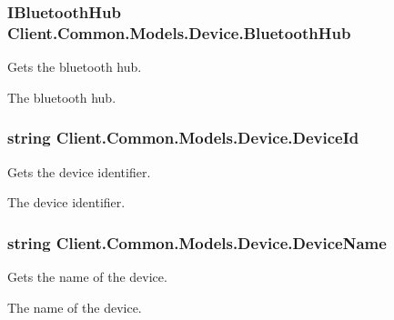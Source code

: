 \subsubsection[{Bluetooth\+Hub}]{\setlength{\rightskip}{0pt plus 5cm}I\+Bluetooth\+Hub Client.\+Common.\+Models.\+Device.\+Bluetooth\+Hub\hspace{0.3cm}{\ttfamily [get]}}\label{classClient_1_1Common_1_1Models_1_1Device_aa60310c6baea9e6d3953dc9b6cb469d9}


Gets the bluetooth hub. 

The bluetooth hub.\hypertarget{classClient_1_1Common_1_1Models_1_1Device_afcedfb23804f4fa905e3cf534d17d44e}{}
\subsubsection[{Device\+Id}]{\setlength{\rightskip}{0pt plus 5cm}string Client.\+Common.\+Models.\+Device.\+Device\+Id\hspace{0.3cm}{\ttfamily [get]}}\label{classClient_1_1Common_1_1Models_1_1Device_afcedfb23804f4fa905e3cf534d17d44e}


Gets the device identifier. 

The device identifier.\hypertarget{classClient_1_1Common_1_1Models_1_1Device_a256551335f6465871fa46566a4f6cb13}{}
\subsubsection[{Device\+Name}]{\setlength{\rightskip}{0pt plus 5cm}string Client.\+Common.\+Models.\+Device.\+Device\+Name\hspace{0.3cm}{\ttfamily [get]}}\label{classClient_1_1Common_1_1Models_1_1Device_a256551335f6465871fa46566a4f6cb13}


Gets the name of the device. 

The name of the device.\hypertarget{classClient_1_1Common_1_1Models_1_1Device_a45a4827c220415e029d0b8e1c87bb1a0}{}
